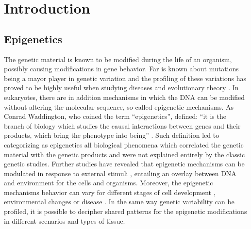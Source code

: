 
\chapter{Introduction}\label{Intro}   %


\section{Epigenetics}

The genetic material is known to be modified during the life of an organism, possibly causing modifications in gene behavior. Far is known about mutations being a mayor player in genetic variation and the profiling of these variations has proved to be highly useful when studying diseases and evolutionary theory \cite{Wray2007}. In eukaryotes, there are in addition mechanisms in which the DNA can be modified without altering the molecular sequence, so called epigenetic mechanisms. As Conrad Waddington, who coined the term ``epigenetics'', defined: ``it is the branch of biology which studies the causal interactions between genes and their products, which bring the phenotype into being'' \cite{Waddington1942}. Such definition led to categorizing as epigenetics all biological phenomena which correlated the genetic material with the genetic products and were not explained entirely by the classic genetic studies. Further studies have revealed that epigenetic mechanisms can be modulated in response to external stimuli \cite{Liu2004,Backdahl2009}, entailing an overlay between DNA  and environment for the cells and organisms. Moreover, the epigenetic mechanisms behavior can vary for different stages of cell development \cite{Kiefer2007}, environmental changes \cite{Sutherland2003} or disease \cite{Jessberger2007}. In the same way genetic variability can be profiled, it is possible to decipher shared patterns for the epigenetic modifications in different scenarios and types of tissue.

\medskip

